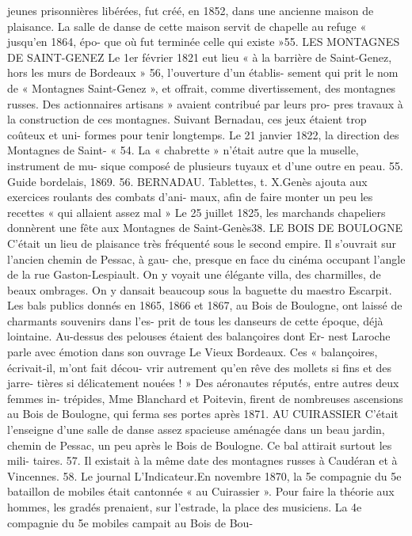 \documentclass[a4paper,11pt]{book}
\begin{document}
jeunes prisonnières libérées, fut créé, en 1852, dans une
ancienne maison de plaisance. La salle de danse de cette
maison servit de chapelle au refuge « jusqu'en 1864, épo-
que où fut terminée celle qui existe »55.
LES MONTAGNES DE SAINT-GENEZ
Le 1er février 1821 eut lieu « à la barrière de Saint-Genez,
hors les murs de Bordeaux » 56, l'ouverture d'un établis-
sement qui prit le nom de « Montagnes Saint-Genez », et
offrait, comme divertissement, des montagnes russes. Des
actionnaires artisans » avaient contribué par leurs pro-
pres travaux à la construction de ces montagnes.
Suivant Bernadau, ces jeux étaient trop coûteux et uni-
formes pour tenir longtemps.
Le 21 janvier 1822, la direction des Montagnes de Saint-
«
54. La « chabrette » n'était autre que la muselle, instrument de mu-
sique composé de plusieurs tuyaux et d'une outre en peau.
55. Guide bordelais, 1869.
56. BERNADAU. Tablettes, t. X.Genès ajouta aux exercices roulants des combats d'ani-
maux, afin de faire monter un peu les recettes « qui allaient
assez mal »
Le 25 juillet 1825, les marchands chapeliers donnèrent
une fête aux Montagnes de Saint-Genès38.
LE BOIS DE BOULOGNE
C'était un lieu de plaisance très fréquenté sous le second
empire. Il s'ouvrait sur l'ancien chemin de Pessac, à gau-
che, presque en face du cinéma occupant l'angle de la
rue Gaston-Lespiault. On y voyait une élégante villa, des
charmilles, de beaux ombrages. On y dansait beaucoup
sous la baguette du maestro Escarpit.
Les bals publics donnés en 1865, 1866 et 1867, au Bois
de Boulogne, ont laissé de charmants souvenirs dans l'es-
prit de tous les danseurs de cette époque, déjà lointaine.
Au-dessus des pelouses étaient des balançoires dont Er-
nest Laroche parle avec émotion dans son ouvrage Le Vieux
Bordeaux. Ces « balançoires, écrivait-il, m'ont fait décou-
vrir autrement qu'en rêve des mollets si fins et des jarre-
tières si délicatement nouées ! »
Des aéronautes réputés, entre autres deux femmes in-
trépides, Mme Blanchard et Poitevin, firent de nombreuses
ascensions au Bois de Boulogne, qui ferma ses portes
après 1871.
AU CUIRASSIER
C'était l'enseigne d'une salle de danse assez spacieuse
aménagée dans un beau jardin, chemin de Pessac, un peu
après le Bois de Boulogne. Ce bal attirait surtout les mili-
taires.
57. Il existait à la même date des montagnes russes à Caudéran et
à Vincennes.
58. Le journal L'Indicateur.En novembre 1870, la 5e compagnie du 5e bataillon de
mobiles était cantonnée « au Cuirassier
». Pour faire la
théorie aux hommes, les gradés prenaient, sur l'estrade, la
place des musiciens.
La 4e compagnie du 5e mobiles campait au Bois de Bou-
\end{document}
